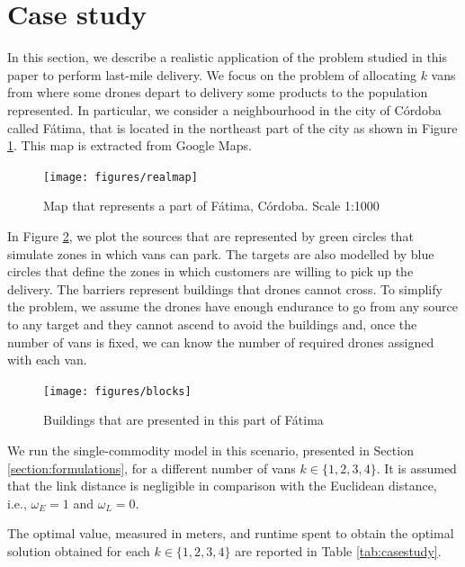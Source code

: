 \documentclass[a4paper,  review, authoryear, 1p.]{elsarticle}
\newcommand{\CV}[1]{{\color{blue}#1}}
\begin{document}
		\CV{
		\section{Case study}\label{section:casestudy}
		In this section, we describe a realistic application of the problem studied in this paper to perform last-mile delivery. We focus on the problem of allocating $k$ vans from where some drones depart to delivery some products to the population represented. In particular, we consider a neighbourhood in the city of Córdoba called Fátima, that is located in the northeast part of the city as shown in Figure \ref{fig:realmap}. This map is extracted from Google Maps.
		
		\begin{figure}[H]
			\centering
			\caption{Map that represents a part of Fátima, Córdoba. Scale 1:1000}
			\texttt{[image: figures/realmap]}
			\label{fig:realmap}

		\end{figure}
		
		In Figure \ref{fig:blocks}, we plot the sources that are represented by green circles that simulate zones in which vans can park. The targets are also modelled by blue circles that define the zones in which customers are willing to pick up the delivery. The barriers represent buildings that drones cannot cross. To simplify the problem, we assume the drones have enough endurance to go from any source to any target and they cannot ascend to avoid the buildings and, once the number of vans is fixed, we can know the number of required drones assigned with each van.
		
		\begin{figure}[H]
			\centering
			\caption{Buildings that are presented in this part of Fátima}
			\texttt{[image: figures/blocks]}
			\label{fig:blocks}
		\end{figure}
		
		We run the single-commodity model in this scenario,  presented in Section \ref{section:formulations}, for a different number of vans $k\in\{1, 2, 3, 4\}$. It is assumed that the link distance is negligible in comparison with the Euclidean distance, i.e., $\omega_E=1$ and $\omega_L=0$. 
		
		The optimal value, measured in meters, and runtime spent to obtain the optimal solution obtained for each $k\in\{1,2,3,4\}$ are reported in Table \ref{tab:casestudy}. 
		
}
\end{document}

